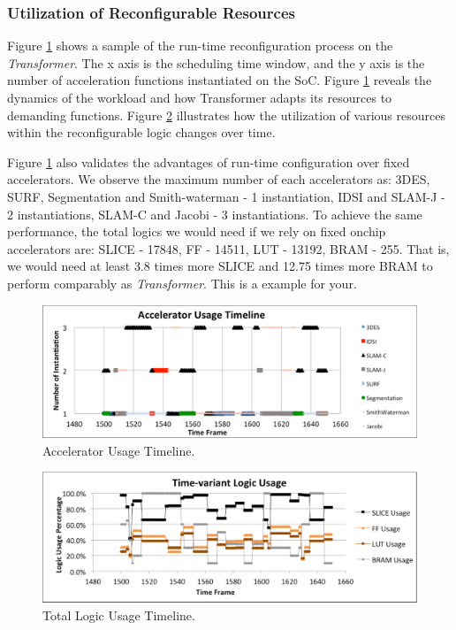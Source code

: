 \subsubsection{Utilization of Reconfigurable Resources}

Figure \ref{fig_acc_timeline} shows a sample of the run-time
reconfiguration process on the {\em Transformer}. The x axis is the
scheduling time window, and the y axis is the number of acceleration
functions instantiated on the SoC. Figure \ref{fig_acc_timeline}
reveals the dynamics of the workload and how {Transformer} adapts its
resources to demanding functions. Figure \ref{fig_logic_timeline}
illustrates how the utilization of various resources within the
reconfigurable logic changes over time.

Figure \ref{fig_acc_timeline}  also validates the advantages of run-time
configuration over fixed accelerators. We observe the maximum number of each
accelerators as: 3DES, SURF, Segmentation and Smith-waterman - 1
instantiation, IDSI and SLAM-J - 2 instantiations, SLAM-C and Jacobi -
3 instantiations. To achieve the same performance, the total logics we
would need if we rely on fixed onchip accelerators are: SLICE - 17848, FF
- 14511, LUT - 13192, BRAM - 255. That is, we would need at least 3.8 times
more SLICE and 12.75 times more BRAM to perform comparably as {\em Transformer}. 
This is a example for your.


\begin{figure}[ht]
    \centering
    \includegraphics[width=6.0in]{Acc_timeline}
    \caption{Accelerator Usage Timeline.}
    \label{fig_acc_timeline}
\end{figure}

\begin{figure}[ht]
    \centering
    \includegraphics[width=6.0in]{Logic-Usage-Timeline}
    \caption{Total Logic Usage Timeline.}
    \label{fig_logic_timeline}
\end{figure}
